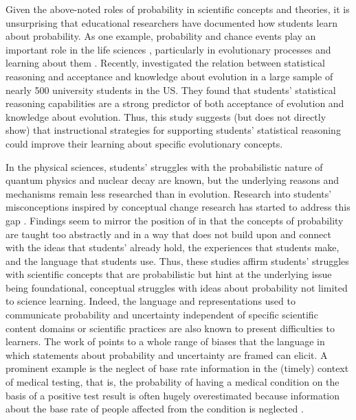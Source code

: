\documentclass[man]{apa7}
\begin{document}
Given the above-noted roles of probability in scientific concepts and theories, it is unsurprising that educational researchers have documented how students learn about probability. As one example, probability and chance events play an important role in the life sciences \parencite{g03, gk08}, particularly in evolutionary processes and learning about them \parencite{th17}. Recently, \textcite{fsnh19} investigated the relation between statistical reasoning and acceptance and knowledge about evolution in a large sample of nearly 500 university students in the US. They found that students’ statistical reasoning capabilities are a strong predictor of both acceptance of evolution and knowledge about evolution. Thus, this study suggests (but does not directly show) that instructional strategies for supporting students’ statistical reasoning could improve their learning about specific evolutionary concepts.

In the physical sciences, students' struggles with the probabilistic nature of quantum physics \parencite{br02} and nuclear decay \parencite{smmv17} are known, but the underlying reasons and mechanisms remain less researched than in evolution. Research into students’ misconceptions inspired by conceptual change research has started to address this gap \parencite{ms15, alra14, st09}. Findings seem to mirror the position of \textcite{bgv94} in that the concepts of probability are taught too abstractly and in a way that does not build upon and connect with the ideas that students’ already hold, the experiences that students make, and the language that students use. Thus, these studies affirm students' struggles with scientific concepts that are probabilistic but hint at the underlying issue being foundational, conceptual struggles with ideas about probability not limited to science learning. Indeed, the language and representations used to communicate probability and uncertainty independent of specific scientific content domains or scientific practices are also known to present difficulties to learners. The work of \textcite{tk74} points to a whole range of biases that the language in which statements about probability and uncertainty are framed can elicit. A prominent example is the neglect of base rate information in the (timely) context of medical testing, that is, the probability of having a medical condition on the basis of a positive test result is often hugely overestimated because information about the base rate of people affected from the condition is neglected \parencite{kahneman_thinking_2012}.
\end{document}
